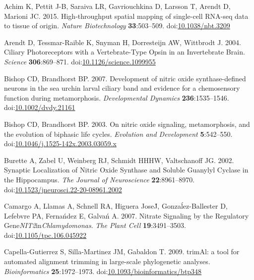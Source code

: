 \documentclass[
  10pt,
  onecolumn]{article}
\newlength{\cslhangindent}
\newlength{\cslentryspacingunit} %
\newenvironment{CSLReferences}[2] %
 {%
  \setlength{\parindent}{0pt}
  \ifodd #1
  \let\oldpar\par
  \def\par{\hangindent=\cslhangindent\oldpar}
  \fi
  \setlength{\parskip}{#2\cslentryspacingunit}
 }%
 {}
\begin{document}
\hypertarget{refs}{}
\begin{CSLReferences}{1}{0}
\leavevmode{}%
Achim K, Pettit J-B, Saraiva LR, Gavriouchkina D, Larsson T, Arendt D,
Marioni JC. 2015. High-throughput spatial mapping of single-cell RNA-seq
data to tissue of origin. \emph{Nature Biotechnology}
\textbf{33}:503--509.
doi:\href{https://doi.org/10.1038/nbt.3209}{10.1038/nbt.3209}

\leavevmode{}%
Arendt D, Tessmar-Raible K, Snyman H, Dorresteijn AW, Wittbrodt J. 2004.
Ciliary Photoreceptors with a Vertebrate-Type Opsin in an Invertebrate
Brain. \emph{Science} \textbf{306}:869--871.
doi:\href{https://doi.org/10.1126/science.1099955}{10.1126/science.1099955}

\leavevmode{}%
Bishop CD, Brandhorst BP. 2007. Development of nitric oxide
synthase-defined neurons in the sea urchin larval ciliary band and
evidence for a chemosensory function during metamorphosis.
\emph{Developmental Dynamics} \textbf{236}:1535--1546.
doi:\href{https://doi.org/10.1002/dvdy.21161}{10.1002/dvdy.21161}

\leavevmode{}%
Bishop CD, Brandhorst BP. 2003. On nitric oxide signaling,
metamorphosis, and the evolution of biphasic life cycles.
\emph{Evolution and Development} \textbf{5}:542--550.
doi:\href{https://doi.org/10.1046/j.1525-142x.2003.03059.x}{10.1046/j.1525-142x.2003.03059.x}

\leavevmode{}%
Burette A, Zabel U, Weinberg RJ, Schmidt HHHW, Valtschanoff JG. 2002.
Synaptic Localization of Nitric Oxide Synthase and Soluble Guanylyl
Cyclase in the Hippocampus. \emph{The Journal of Neuroscience}
\textbf{22}:8961--8970.
doi:\href{https://doi.org/10.1523/jneurosci.22-20-08961.2002}{10.1523/jneurosci.22-20-08961.2002}

\leavevmode{}%
Camargo A, Llamas A, Schnell RA, Higuera JoseJ́, Gonzaĺez-Ballester D,
Lefebvre PA, Fernańdez E, Galvań A. 2007. Nitrate Signaling by the
Regulatory Gene{\emph{NIT2}}in{\emph{Chlamydomonas}}. \emph{The Plant
Cell} \textbf{19}:3491--3503.
doi:\href{https://doi.org/10.1105/tpc.106.045922}{10.1105/tpc.106.045922}

\leavevmode{}%
Capella-Gutierrez S, Silla-Martinez JM, Gabaldon T. 2009. trimAl: a tool
for automated alignment trimming in large-scale phylogenetic analyses.
\emph{Bioinformatics} \textbf{25}:1972--1973.
doi:\href{https://doi.org/10.1093/bioinformatics/btp348}{10.1093/bioinformatics/btp348}


\end{CSLReferences}
\end{document}
